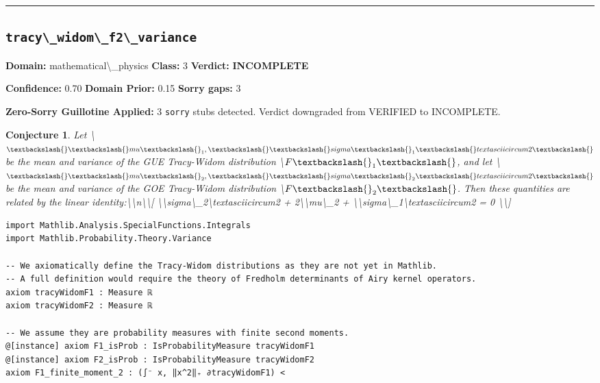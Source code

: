 \documentclass[12pt,a4paper]{article}
\newtheorem{conjecture}{Conjecture}
\begin{document}
\hrule\medskip

\subsection*{\texttt{tracy\textbackslash{}_widom\textbackslash{}_f2\textbackslash{}_variance}}

\textbf{Domain:} mathematical\textbackslash{}_physics \quad \textbf{Class:} 3 \quad \textbf{Verdict:} \textcolor{incompleteamber}{\textbf{INCOMPLETE}}

\textbf{Confidence:} 0.70 \quad \textbf{Domain Prior:} 0.15 \quad \textbf{Sorry gaps:} 3

\textcolor{sorryred}{\textbf{Zero-Sorry Guillotine Applied:} 3 \texttt{sorry} stubs detected. Verdict downgraded from VERIFIED to INCOMPLETE.}

\begin{conjecture}
Let \textbackslash{}$\textbackslash{}\textbackslash{}mu\textbackslash{}_1, \textbackslash{}\textbackslash{}sigma\textbackslash{}_1\textbackslash{}textasciicircum{}2\textbackslash{}$ be the mean and variance of the GUE Tracy-Widom distribution \textbackslash{}$F\textbackslash{}_1\textbackslash{}$, and let \textbackslash{}$\textbackslash{}\textbackslash{}mu\textbackslash{}_2, \textbackslash{}\textbackslash{}sigma\textbackslash{}_2\textbackslash{}textasciicircum{}2\textbackslash{}$ be the mean and variance of the GOE Tracy-Widom distribution \textbackslash{}$F\textbackslash{}_2\textbackslash{}$. Then these quantities are related by the linear identity:\textbackslash{}\textbackslash{}n\textbackslash{}\textbackslash{}[ \textbackslash{}\textbackslash{}sigma\textbackslash{}_2\textbackslash{}textasciicircum{}2 + 2\textbackslash{}\textbackslash{}mu\textbackslash{}_2 + \textbackslash{}\textbackslash{}sigma\textbackslash{}_1\textbackslash{}textasciicircum{}2 = 0 \textbackslash{}\textbackslash{}]
\end{conjecture}

\begin{lstlisting}[caption={Lean 4 Sketch (v14 Galois)}]
import Mathlib.Analysis.SpecialFunctions.Integrals
import Mathlib.Probability.Theory.Variance

-- We axiomatically define the Tracy-Widom distributions as they are not yet in Mathlib.
-- A full definition would require the theory of Fredholm determinants of Airy kernel operators.
axiom tracyWidomF1 : Measure ℝ
axiom tracyWidomF2 : Measure ℝ

-- We assume they are probability measures with finite second moments.
@[instance] axiom F1_isProb : IsProbabilityMeasure tracyWidomF1
@[instance] axiom F2_isProb : IsProbabilityMeasure tracyWidomF2
axiom F1_finite_moment_2 : (∫⁻ x, ‖x^2‖₊ ∂tracyWidomF1) <
\end{lstlisting}
\end{document}

